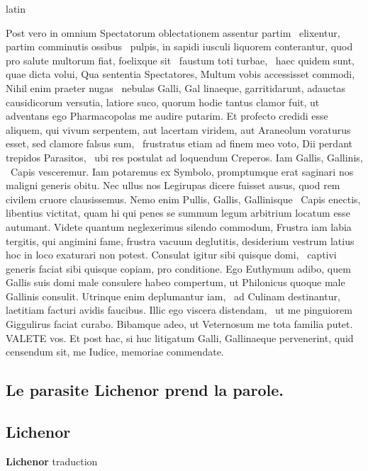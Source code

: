 \documentclass[12pt]{book}
\renewenvironment{latin}
    	{\begin{hyphenrules}{latin}}
    	{\end{hyphenrules}}
\begin{document}
\begin{pages}
\begin{latin}
\begin{Leftside}
                    Post vero in omnium Spectatorum oblectationem assentur partim ﻿\ampersand\ elixentur, partim comminutis ossibus ﻿\ampersand\ pulpis, in sapidi iusculi liquorem conterantur, quod pro salute multorum fiat, foelixque sit ﻿\ampersand\ faustum toti turbae, ﻿\ampersand\ haec quidem sunt, quae dicta volui, Qua sententia Spectatores, Multum vobis accessisset commodi, Nihil enim praeter nugas ﻿\ampersand\ nebulas Galli, Gal   linaeque, garritidarunt, adauctas causidicorum versutia, latiore suco, quorum hodie tantus clamor fuit, ut adventans ego Pharmacopolas me audire putarim. 
                    Et profecto credidi esse aliquem, qui vivum serpentem, aut lacertam viridem, aut Araneolum voraturus esset, sed clamore falsus sum, ﻿\ampersand\ frustratus etiam ad finem meo voto, Dii perdant trepidos Parasitos, ﻿\ampersand\ ubi res postulat ad loquendum Creperos. 
                    Iam Gallis, Gallinis, ﻿\ampersand\ Capis vesceremur. 
                    Iam potaremus ex Symbolo, promptumque erat saginari nos maligni generis obitu. 
                    Nec ullus nos Legirupas dicere fuisset ausus, quod rem civilem cruore clausissemus. 
                    Nemo enim Pullis, Gallis, Gallinisque ﻿\ampersand\ Capis enectis, libentius victitat, quam hi qui penes se summum legum arbitrium locatum esse autumant. 
                    Videte quantum neglexerimus silendo commodum, Frustra iam labia tergitis, qui angimini fame, frustra vacuum deglutitis, desiderium vestrum latius hoc in loco exaturari non potest. 
                    Consulat igitur sibi quisque domi, ﻿\ampersand\ captivi generis faciat sibi quisque copiam, pro conditione. 
                    Ego Euthymum adibo, quem Gallis suis domi male consulere habeo compertum, ut Philonicus quoque male Gallinis consulit. 
                    Utrinque enim deplumantur iam, ﻿\ampersand\ ad Culinam destinantur, laetitiam facturi avidis faucibus. 
                    Illic ego viscera distendam, ﻿\ampersand\ ut me pinguiorem Giggulirus faciat curabo. 
                    Bibamque adeo, ut Veternosum me tota familia putet. VALETE vos. 
                    Et post hac, si huc litigatum Galli, Gallinaeque pervenerint, quid censendum sit, me Iudice, memoriae commendate.
                \pend 
        \endnumbering
        \end{Leftside}
        \end{latin}

        \begin{Rightside}
        \beginnumbering
            \pstart\section*{Le parasite Lichenor prend la parole.}\pend\pstart\subsection*{Lichenor}\pend\pstart\textbf{Lichenor}\hspace{1cm} 
                        traduction
                    \pend
        \endnumbering
        \end{Rightside}
        \end{pages}
        \Pages
        
\end{document}
